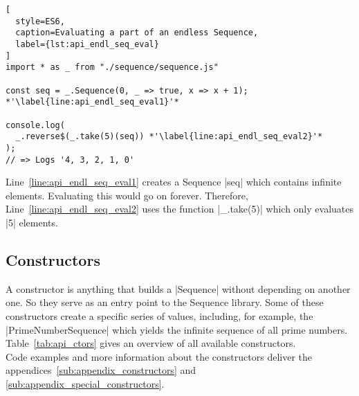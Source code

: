 \begin{lstlisting}[
  style=ES6,
  caption=Evaluating a part of an endless Sequence,
  label={lst:api_endl_seq_eval}
]
import * as _ from "./sequence/sequence.js"

const seq = _.Sequence(0, _ => true, x => x + 1); *'\label{line:api_endl_seq_eval1}'*

console.log(
  _.reverse$(_.take(5)(seq)) *'\label{line:api_endl_seq_eval2}'*
);  
// => Logs '4, 3, 2, 1, 0'
\end{lstlisting}

Line~\ref{line:api_endl_seq_eval1} creates a Sequence |seq| which contains
infinite elements. Evaluating this would go on forever. Therefore,
Line~\ref{line:api_endl_seq_eval2} uses the function |_.take(5)| which only
evaluates |5| elements.

\label{sec:api_sequences}
\subsection{Constructors} %
\label{sub:Constructors}
A constructor is anything that builds a |Sequence| without depending on another
one. So they serve as an entry point to the Sequence library. Some of these
constructors create a specific series of values, including, for example, the
|PrimeNumberSequence| which yields the infinite sequence of all prime
numbers.\\
Table~\ref{tab:api_ctors} gives an overview of all available constructors. \\
Code examples and more information about the constructors deliver the
appendices~\ref{sub:appendix_constructors} and
\ref{sub:appendix_special_constructors}.

